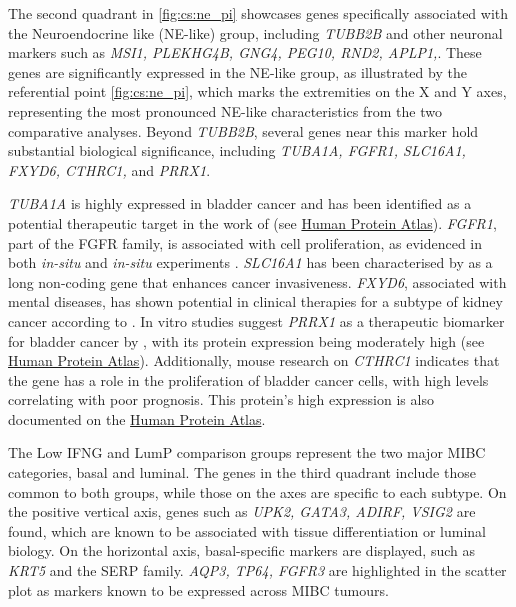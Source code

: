 The second quadrant in \cref{fig:cs:ne_pi} showcases genes specifically associated with the Neuroendocrine like (NE-like) group, including \textit{TUBB2B} and other neuronal markers such as \textit{MSI1, PLEKHG4B, GNG4, PEG10, RND2, APLP1,}\citep{Robertson2017-mg}. These genes are significantly expressed in the NE-like group, as illustrated by the referential point \cref{fig:cs:ne_pi}, which marks the extremities on the X and Y axes, representing the most pronounced NE-like characteristics from the two comparative analyses. Beyond \textit{TUBB2B}, several genes near this marker hold substantial biological significance, including \textit{TUBA1A, FGFR1, SLC16A1, FXYD6, CTHRC1,} and \textit{PRRX1}.

\textit{TUBA1A} is highly expressed in bladder cancer and has been identified as a potential therapeutic target in the work of \citet{Zhang2019-fk} (see \href{https://www.proteinatlas.org/ENSG00000167552-TUBA1A/tissue}{Human Protein Atlas}). \textit{FGFR1}, part of the FGFR family, is associated with cell proliferation, as evidenced in both \textit{in-situ} and \textit{in-situ} experiments \citet{Tomlinson2009-td}. \textit{SLC16A1} has been characterised by \citet{Logotheti2020-ya} as a long non-coding gene that enhances cancer invasiveness. \textit{FXYD6}, associated with mental diseases, has shown potential in clinical therapies for a subtype of kidney cancer according to \citet{Gao2014-sq}. In vitro studies suggest \textit{PRRX1} as a therapeutic biomarker for bladder cancer by \citet{Huang2022-ez}, with its protein expression being moderately high (see \href{https://www.proteinatlas.org/ENSG00000116132-PRRX1/tissue}{Human Protein Atlas}). Additionally, mouse research on \textit{CTHRC1} indicates that the gene has a role in the proliferation of bladder cancer cells, with high levels correlating with poor prognosis. This protein's high expression is also documented on the \href{https://www.proteinatlas.org/ENSG00000164932-CTHRC1/tissue}{Human Protein Atlas}.

The Low IFNG and LumP comparison groups represent the two major MIBC categories, basal and luminal. The genes in the third quadrant include those common to both groups, while those on the axes are specific to each subtype. On the positive vertical axis, genes such as \textit{UPK2, GATA3, ADIRF, VSIG2} are found, which are known to be associated with tissue differentiation or luminal biology. On the horizontal axis, basal-specific markers are displayed, such as \textit{KRT5} and the SERP family. \textit{AQP3, TP64, FGFR3} are highlighted in the scatter plot as markers known to be expressed across MIBC tumours.

